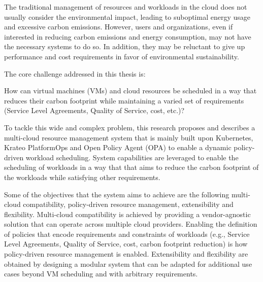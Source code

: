 
The traditional management of resources and workloads in the cloud does not usually consider the environmental impact, leading to suboptimal energy usage and excessive carbon emissions.
However, users and organizations, even if interested in reducing carbon emissions and energy consumption, may not have the necessary systems to do so.
In addition, they may be reluctant to give up performance and cost requirements in favor of environmental sustainability.

The core challenge addressed in this thesis is:
\begin{center}
    How can virtual machines (VMs) and cloud resources be scheduled in a way that reduces their carbon footprint while maintaining a varied set of requirements (Service Level Agreements, Quality of Service, cost, etc.)?
\end{center}

To tackle this wide and complex problem, this research proposes and describes a multi-cloud resource management system that is mainly built upon Kubernetes, Krateo PlatformOps and Open Policy Agent (OPA) to enable a dynamic policy-driven workload scheduling.
System capabilities are leveraged to enable the scheduling of workloads in a way that that aims to reduce the carbon footprint of the workloads while satisfying other requirements.

Some of the objectives that the system aims to achieve are the following multi-cloud compatibility, policy-driven resource management, extensibility and flexibility.
Multi-cloud compatibility is achieved by providing a vendor-agnostic solution that can operate across multiple cloud providers.
Enabling the definition of policies that encode requirements and constraints of workloads (e.g., Service Level Agreements, Quality of Service, cost, carbon footprint reduction) is how policy-driven resource management is enabled.
Extensibility and flexibility are obtained by designing a modular system that can be adapted for additional use cases beyond VM scheduling and with arbitrary requirements. \newline
    



